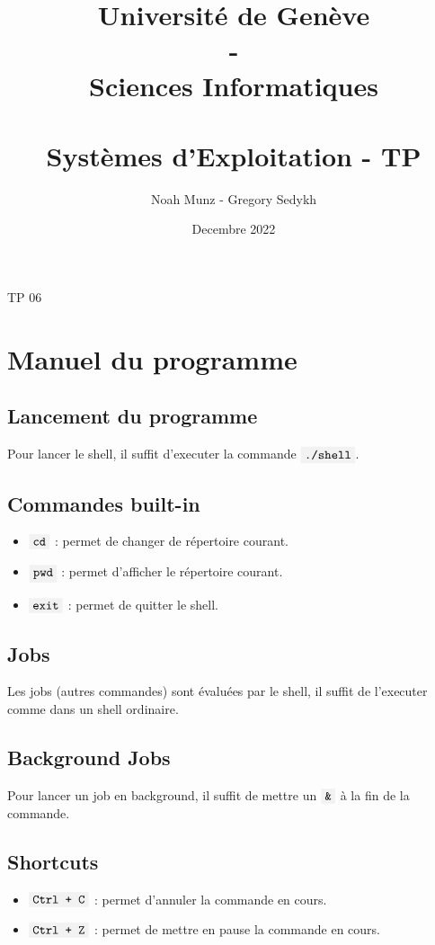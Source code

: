\documentclass[french]{article}
\title{\vspace{-2.5cm}
   {\huge Université de Genève \\ - \\ Sciences Informatiques} \\
    \vspace{0.6cm}
    \unilogo{0.38} \\
    \vspace{1.1cm}
    {\huge Systèmes d'Exploitation - TP \nb}
    \vspace{0.1cm}
}
\author{Noah Munz - Gregory Sedykh}
\date{Decembre 2022}
\newcommand{\code}[1]{$\mbox{\colorbox{light-gray}{\texttt{#1}}}$}
\newcommand{\nb}{06}
\begin{document}
%
\maketitle
\vspace{0.3cm}
\thispagestyle{empty}
\clearpage
\setcounter{page}{1}
%
%
\begin{center}
{\huge TP \nb}
\end{center}
\vspace{0.3cm}

\section*{Manuel du programme}

\subsection*{Lancement du programme}
Pour lancer le shell, il suffit d'executer la commande \code{./shell}.

\subsection*{Commandes built-in}
\begin{itemize}
    \item \code{cd} : permet de changer de répertoire courant.
    \item \code{pwd} : permet d'afficher le répertoire courant.
    \item \code{exit} : permet de quitter le shell.
\end{itemize}

\subsection*{Jobs}
Les jobs (autres commandes) sont évaluées par le shell, il suffit de l'executer comme dans un shell ordinaire.

\subsection*{Background Jobs}
Pour lancer un job en background, il suffit de mettre un \code{\&} à la fin de la commande.


\subsection*{Shortcuts}
\begin{itemize}
    \item \code{Ctrl + C} : permet d'annuler la commande en cours.
    \item \code{Ctrl + Z} : permet de mettre en pause la commande en cours.
\end{itemize}
\end{document}
